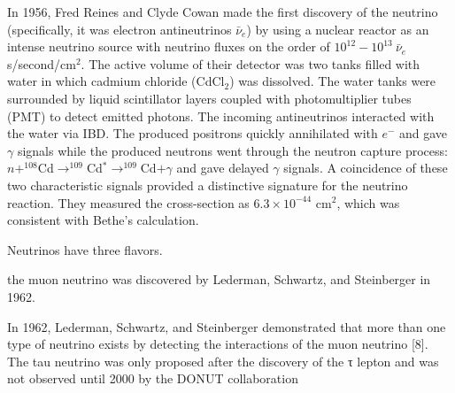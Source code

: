 In 1956, Fred Reines and Clyde Cowan made the first discovery of the neutrino (specifically, it was electron antineutrinos $\bar{\nu}_e$) by using a nuclear reactor as an intense neutrino source with neutrino fluxes on the order of $10^{12}-10^{13}~\bar{\nu}_e$ s/second/cm$^2$. The active volume of their detector was two tanks filled with water in which cadmium chloride (CdCl$_2$) was dissolved. The water tanks were surrounded by liquid scintillator layers coupled with photomultiplier tubes (PMT) to detect emitted photons. The incoming antineutrinos interacted with the water via IBD. The produced positrons quickly annihilated with $e^-$ and gave $\gamma$ signals while the produced neutrons went through the neutron capture process: $n+^{108}$Cd$\to^{109}$Cd$^*\to^{109}$Cd$+\gamma$ and gave delayed $\gamma$ signals. A coincidence of these two characteristic signals provided a distinctive signature for the neutrino reaction. They measured the cross-section as $6.3\times10^{-44}$ cm$^2$, which was consistent with Bethe's calculation\cite{reines1960detection}.








Neutrinos have three flavors.


the muon neutrino was discovered by Lederman, Schwartz, and Steinberger in 1962.

In 1962, Lederman, Schwartz, and Steinberger demonstrated that more than one
type of neutrino exists by detecting the interactions of the muon neutrino [8]. The tau
neutrino was only proposed after the discovery of the τ lepton and was not observed
until 2000 by the DONUT collaboration 

